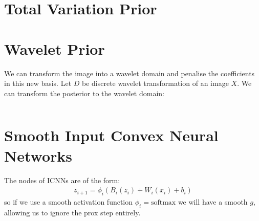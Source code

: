 \documentclass[a4paper,10pt]{article}
\numberwithin{equation}{section}
\numberwithin{thm}{section}
\begin{document}
 
\newpage
\section{Total Variation Prior}



\newpage
\section{Wavelet Prior}

We can transform the image into a wavelet domain and penalise the coefficients in this new basis. Let $D$ be discrete wavelet transformation of an image $X$. We can transform the posterior to the wavelet domain:

\begin{equation}
	
\end{equation}






\newpage
\section{Smooth Input Convex Neural Networks}

The nodes of ICNNs are of the form:
\begin{align*}
 z_{i+1} = \phi_i ( B_i (z_i) + W_i(x_i) + b_i)	
\end{align*}
so if we use a smooth activation function $\phi_i = \text{softmax}$ we will have a smooth $g$, allowing us to ignore the prox step entirely. 
\end{document}
